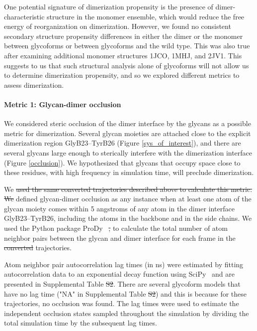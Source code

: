 \documentclass[9pt]{elife}
\providecommand{\DIFaddtex}[1]{{\protect\color{blue}\uwave{#1}}} %
\providecommand{\DIFdeltex}[1]{{\protect\color{red}\sout{#1}}}                      %
\providecommand{\DIFaddbegin}{} %
\providecommand{\DIFaddend}{} %
\providecommand{\DIFdelbegin}{} %
\providecommand{\DIFdelend}{} %
\providecommand{\DIFadd}[1]{\texorpdfstring{\DIFaddtex{#1}}{#1}} %
\providecommand{\DIFdel}[1]{\texorpdfstring{\DIFdeltex{#1}}{}} %
\begin{document}
One potential signature of dimerization propensity is the presence of dimer-characteristic structure in the monomer ensemble, which would reduce the free energy of reorganization on dimerization. However, we found no consistent secondary structure propensity differences in either the dimer or the monomer between glycoforms or between glycoforms and the wild type. This was also true after examining additional monomer structures 1JCO\DIFaddbegin \DIFadd{~\mbox{%
\cite{keller2001flexibility}}\hspace{0pt}%
}\DIFaddend , 1MHJ\DIFaddbegin \DIFadd{~\mbox{%
\cite{jorgensen1996solution}}\hspace{0pt}%
}\DIFaddend , and 2JV1\DIFaddbegin \DIFadd{~\mbox{%
\cite{bocian2008structure}}\hspace{0pt}%
}\DIFaddend . This suggests to us that such structural analysis alone of glycoforms will not allow us to determine dimerization propensity, and so we explored different metrics to assess dimerization.
\paragraph{Metric 1: Glycan-dimer occlusion}
We considered steric occlusion of the dimer interface by the glycans as a possible metric for dimerization. Several glycan moieties are attached close to the explicit dimerization region GlyB23--TyrB26 (Figure \ref{sys_of_interest}), and there are several glycans large enough to sterically interfere with the dimerization interface (Figure \ref{occlusion}). We hypothesized that glycans that occupy space close to these residues, with high frequency in simulation time, will preclude dimerization.

We \DIFdelbegin \DIFdel{used the same converted trajectories described above to calculate this metric. We }\DIFdelend defined glycan-dimer occlusion as any instance when at least one atom of the glycan moiety comes within 5 angstroms of any atom in the dimer interface GlyB23--TyrB26, including the atoms in the backbone and in the side chains. We used the Python package ProDy~\cite{bakan2011prody} \DIFdelbegin \DIFdel{, }\DIFdelend to calculate the total number of atom neighbor pairs between the glycan and dimer interface for each frame in the \DIFdelbegin \DIFdel{converted }\DIFdelend trajectories.

Atom neighbor pair autocorrelation lag times (in ns) were estimated by fitting autocorrelation data to an exponential decay function using SciPy~\cite{scipy2020pub, numpy2020pub} and are presented in Supplemental Table \DIFdelbegin \DIFdel{S2}\DIFdelend \DIFaddbegin \DIFadd{S4}\DIFaddend . There are several glycoform models that have no lag time ("NA" in Supplemental Table \DIFdelbegin \DIFdel{S2}\DIFdelend \DIFaddbegin \DIFadd{S4}\DIFaddend ) and this is because for these trajectories, no occlusion was found. The lag times were used to estimate the independent occlusion states sampled throughout the simulation by dividing the total simulation time by the subsequent lag times.
\end{document}
